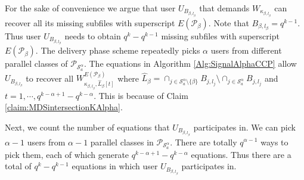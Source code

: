 \documentclass[journal,twocolumn]{IEEEtran}
\theoremstyle{definition}
\newcommand{\calP}{\mathcal{P}}
\newcommand{\calS}{\mathcal{S}}
\begin{document}
	For the sake of convenience we argue that user $U_{B_{\beta, l_\beta}}$ that demands $W_{\kappa_{\beta, l_\beta}}$ can recover all its missing subfiles with superscript $E(\calP_\beta)$. Note that $B_{\beta,l_{\beta}}=q^{k-1}$. Thus user $U_{B_{\beta,l_{\beta}}}$ needs to obtain $q^k-q^{k-1}$ missing subfiles with superscript $E(\calP_{\beta})$. The delivery phase scheme repeatedly picks $\alpha$ users from different parallel classes of $\calP_{\calS^\alpha_a}$. The equations in Algorithm \ref{Alg:SignalAlphaCCP} allow $U_{B_{\beta, l_\beta}}$ to recover all $W^{E(\calP_\beta)}_{\kappa_{\beta,l_\beta},\hat{L}_\beta[t]}$ where $\hat{L}_{\beta} = \cap_{j \in \calS^\alpha_a \setminus \{\beta\}}B_{j,l_j}\setminus \cap_{j \in \calS^\alpha_a} B_{j,l_j}$ and $t=1,\cdots, q^{k-\alpha+1}-q^{k-\alpha}$. This is because of Claim	\ref{claim:MDSintersectionKAlpha}.
	
	Next, we count the number of equations that  $U_{B_{\beta, l_\beta}}$  participates in. We can pick $\alpha-1$ users from $\alpha -1 $ parallel classes in $\calP_{\calS^{\alpha}_a}$. There are totally $q^{\alpha-1}$ ways to pick them, each of which generate $q^{k-\alpha+1}-q^{k-\alpha}$ equations. Thus there are a total of $q^k-q^{k-1}$ equations in which user  $U_{B_{\beta, l_\beta}}$ participates in.
	
\end{document}

